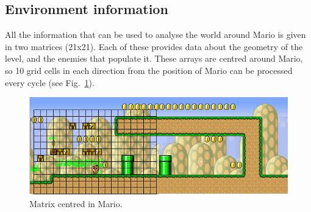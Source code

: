 \documentclass[conference]{IEEEtran}
\begin{document}
\subsection{Environment information} \label{subsec:marioBenchEnviron}

All the information that can be used to analyse the world around Mario is given
in two matrices (21x21). Each of these provides 
data about the geometry of the level, and the enemies that populate it.
These arrays are centred around Mario, so 10 grid cells in each direction from the
position of Mario can be processed every cycle (see Fig.~\ref{fig:matrix}).

\begin{figure} [ht]
	\begin{center}
	\includegraphics[scale=0.45]{images/trapMatrix}
	\caption{Matrix centred in Mario.}
	\label{fig:matrix}
	\end{center}
\end{figure}

\end{document}
